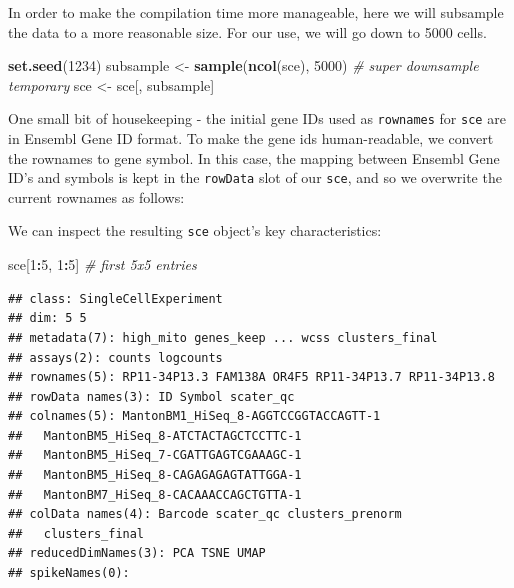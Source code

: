 \documentclass[]{book}
\newenvironment{Shaded}{\begin{snugshade}}{\end{snugshade}}
\newcommand{\CommentTok}[1]{\textcolor[rgb]{0.56,0.35,0.01}{\textit{#1}}}
\newcommand{\DecValTok}[1]{\textcolor[rgb]{0.00,0.00,0.81}{#1}}
\newcommand{\KeywordTok}[1]{\textcolor[rgb]{0.13,0.29,0.53}{\textbf{#1}}}
\newcommand{\NormalTok}[1]{#1}
\newcommand{\OperatorTok}[1]{\textcolor[rgb]{0.81,0.36,0.00}{\textbf{#1}}}
\newcommand{\StringTok}[1]{\textcolor[rgb]{0.31,0.60,0.02}{#1}}
\begin{document}
In order to make the compilation time more manageable, here we will subsample the data to a more reasonable size. For our use, we will go down to 5000 cells.

\begin{Shaded}
\begin{Highlighting}[]
\KeywordTok{set.seed}\NormalTok{(}\DecValTok{1234}\NormalTok{)}
\NormalTok{subsample <-}\StringTok{ }\KeywordTok{sample}\NormalTok{(}\KeywordTok{ncol}\NormalTok{(sce), }\DecValTok{5000}\NormalTok{) }\CommentTok{# super downsample temporary}
\NormalTok{sce <-}\StringTok{ }\NormalTok{sce[, subsample]}
\end{Highlighting}
\end{Shaded}

One small bit of housekeeping - the initial gene IDs used as \texttt{rownames} for \texttt{sce} are in Ensembl Gene ID format. To make the gene ids human-readable, we convert the rownames to gene symbol. In this case, the mapping between Ensembl Gene ID's and symbols is kept in the \texttt{rowData} slot of our \texttt{sce}, and so we overwrite the current rownames as follows:

\begin{Shaded}
\end{Shaded}

We can inspect the resulting \texttt{sce} object's key characteristics:

\begin{Shaded}
\begin{Highlighting}[]
\NormalTok{sce[}\DecValTok{1}\OperatorTok{:}\DecValTok{5}\NormalTok{, }\DecValTok{1}\OperatorTok{:}\DecValTok{5}\NormalTok{] }\CommentTok{# first 5x5 entries}
\end{Highlighting}
\end{Shaded}

\begin{verbatim}
## class: SingleCellExperiment 
## dim: 5 5 
## metadata(7): high_mito genes_keep ... wcss clusters_final
## assays(2): counts logcounts
## rownames(5): RP11-34P13.3 FAM138A OR4F5 RP11-34P13.7 RP11-34P13.8
## rowData names(3): ID Symbol scater_qc
## colnames(5): MantonBM1_HiSeq_8-AGGTCCGGTACCAGTT-1
##   MantonBM5_HiSeq_8-ATCTACTAGCTCCTTC-1
##   MantonBM5_HiSeq_7-CGATTGAGTCGAAAGC-1
##   MantonBM5_HiSeq_8-CAGAGAGAGTATTGGA-1
##   MantonBM7_HiSeq_8-CACAAACCAGCTGTTA-1
## colData names(4): Barcode scater_qc clusters_prenorm
##   clusters_final
## reducedDimNames(3): PCA TSNE UMAP
## spikeNames(0):
\end{verbatim}
\end{document}
